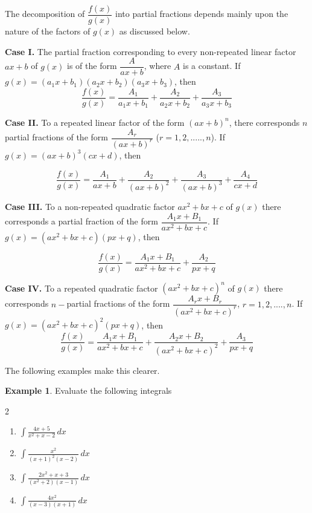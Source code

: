 \documentclass{book}
\theoremstyle{definition}
\newtheorem{example}{Example}[section]
\begin{document}
The decomposition of $\dfrac{f(x)}{g(x)}$ into partial fractions depends mainly upon the nature of the factors of
$g(x)$ as discussed below.

\textbf{Case I.} The partial fraction corresponding to every non-repeated linear factor $ax+b$ of $g(x)$ is of the form $\dfrac{A}{ax+b}$, where $A$ is a constant. If $g(x)=(a_1x+b_1)(a_2x+b_2)(a_3x+b_3)$, then 
\[
\frac{f(x)}{g(x)}=\frac{A_1}{a_1x+b_1}+\frac{A_2}{a_2x+b_2}+\frac{A_3}{a_3x+b_3}
\]


\textbf{Case II.} To a repeated linear factor of the form $(ax+b)^n$, there corresponds $n$ partial fractions of the form $\dfrac{A_r}{(ax+b)^r}$ ($r=1,2,.....,n$). If $g(x)=(ax+b)^3(cx+d)$, then 

\[
\frac{f(x)}{g(x)}=\frac{A_1}{ax+b}+\frac{A_2}{(ax+b)^2}+\frac{A_3}{(ax+b)^3}+\frac{A_4}{cx+d}
\]


\textbf{Case III.} To a non-repeated quadratic factor $ax^2+bx+c$ of $g(x)$ there corresponds a partial fraction of the form $\dfrac{A_1x+B_1}{ax^2+bx+c}$. If $g(x)=(ax^2+bx+c)(px+q)$, then 

\[
\frac{f(x)}{g(x)}=\frac{A_1x+B_1}{ax^2+bx+c}+\frac{A_2}{px+q}
\]

\textbf{Case IV.} To a repeated quadratic factor $(ax^2+bx+c)^n$ of $g(x)$ there corresponds $n-$partial fractions of the form $\dfrac{A_rx+B_r}{(ax^2+bx+c)^r}$, $r=1,2,....,n$. If $g(x)=(ax^2+bx+c)^2(px+q)$, then
\[
\frac{f(x)}{g(x)}=\frac{A_1x+B_1}{ax^2+bx+c}+\frac{A_2x+B_2}{(ax^2+bx+c)^2}+\frac{A_3}{px+q}
\]

The following examples make this clearer.

\begin{example}
Evaluate the following integrals
\begin{multicols}{2}
\begin{enumerate}[label=(\roman*)]
    \item $\displaystyle\int \frac{4x+5}{x^2+x-2}\,dx$
    \item $\displaystyle\int\frac{x^2}{(x+1)^2(x-2)}\,dx$
    \item $\displaystyle\int\frac{2x^2+x+3}{(x^2+2)(x-1)}\,dx$
    \item $\displaystyle\int \frac{4x^2}{(x-3)(x+1)}\,dx$

\end{enumerate}
\end{multicols}    
\end{example} 
\end{document}
